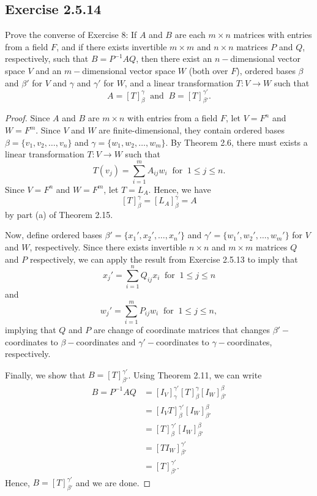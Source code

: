 \subsection*{Exercise 2.5.14} Prove the converse of Exercise 8: If \( A  \) and \( B  \) are each \( m \times n  \) matrices with entries from a field \( F \), and if there exists invertible \( m \times m  \) and \( n \times n  \) matrices \( P  \) and \( Q  \), respectively, such that \( B = P^{-1} A Q  \), then there exist an \( n- \)dimensional vector space \( V  \) and an \( m- \)dimensional vector space \( W  \) (both over \( F \)), ordered bases \( \beta \) and \( \beta'  \) for \( V  \) and \( \gamma \) and \( \gamma'  \) for \( W  \), and a linear transformation \( T: V \to W  \) such that
\[  A = [T]_{\beta}^{\gamma}  \ \text{ and } \ B = [T]_{\beta'}^{\gamma'}. \]
\begin{proof}
    Since \( A  \) and \( B  \) are \( m \times n  \) with entries from a field \( F  \), let \( V = F^{n} \) and \( W = F^{m} \). Since \( V \) and \( W  \) are finite-dimensional, they contain ordered bases \( \beta =  \{ {v}_{1}, {v}_{2}, \dots, {v}_{n} \} \) and \( \gamma = \{ {w}_{1}, {w}_{2}, \dots, {w}_{m} \}   \). By Theorem 2.6, there must exists a linear transformation \( T: V \to W  \) such that 
    \[  T({v}_{j}) = \sum_{ i=1  }^{ m } {A}_{ij} {w}_{i} \ \text{ for } \ 1 \leq j \leq n. \]
    Since \( V = F^{n} \) and \( W = F^{m} \), let \( T = {L}_{A} \). Hence, we have
    \[  [T]_{\beta}^{\gamma} = [{L}_{A}]_{\beta}^{\gamma} = A  \]
    by part (a) of Theorem 2.15.
    
    Now, define ordered bases \( \beta' = \{ {x}_{1}', {x}_{2}', \dots, {x}_{n}' \}  \) and \( \gamma' = \{ {w}_{1}', {w}_{2}', \dots, {w}_{m}' \}  \) for \( V  \) and \( W  \), respectively. Since there exists invertible \( n \times n \) and \( m \times m  \) matrices \( Q  \) and \( P  \) respectively, we can apply the result from Exercise 2.5.13 to imply that
    \[  {x}_{j }' = \sum_{ i=1  }^{ n } {Q}_{ij} {x}_{i} \ \text{ for } \ 1 \leq j \leq n  \] and 
    \[  {w}_{j}' = \sum_{ i=1  }^{ m } {P}_{ij} {w}_{i} \ \text{ for } \ 1 \leq j \leq n ,  \]
    implying that \( Q  \) and \( P  \) are change of coordinate matrices that changes \( \beta'- \)coordinates to \( \beta- \)coordinates and \( \gamma'-\)coordinates to \( \gamma- \)coordinates, respectively. 

    Finally, we show that \( B = [T]_{\beta'}^{\gamma'}  \). Using Theorem 2.11, we can write
    \begin{align*}
        B = P^{-1} A Q &= [{I}_{V}]_{\gamma}^{\gamma'} [T]_{\beta}^{\gamma} [{I}_{W}]_{\beta'}^{\beta}    \\
                       &= [{I}_{V} T ]_{\beta}^{\gamma'} [{I}_{W}]_{\beta'}^{\beta}  \\
                       &= [T]_{\beta}^{\gamma'} [{I}_{W}]_{\beta'}^{\beta}  \\
                       &= [T {I}_{W}]_{\beta'}^{\gamma'}  \\
                       &= [T]_{\beta'}^{\gamma'}.
    \end{align*}
    Hence, \( B = [T]_{\beta'}^{\gamma'}  \) and we are done.
\end{proof}

